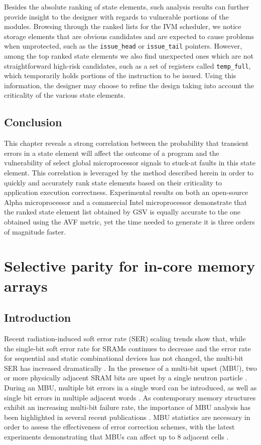 \documentclass[12pt]{yalephd}
\begin{document}
Besides the absolute ranking of state elements, such analysis results can further provide insight to the designer with regards to vulnerable portions of the modules. Browsing through the ranked lists for the IVM scheduler,  we notice storage elements that are obvious candidates and are expected to cause problems when unprotected, such as the {\tt issue\_head} or {\tt issue\_tail} pointers. However, among the top ranked state elements we also find unexpected ones which are not straightforward high-risk candidates, such as a set of registers called {\tt temp\_full}, which temporarily holds portions of the instruction to be issued. Using this information, the designer may choose to refine the design taking into account the criticality of the various state elements.

\section{Conclusion}

This chapter reveals a strong correlation between the probability that transient errors in a state element will affect the outcome of a program and the vulnerability of select global microprocessor signals to stuck-at faults in this state element. This correlation is leveraged by the method described herein in order to quickly and accurately rank state elements based on their criticality to application execution correctness. Experimental results on both an open-source Alpha microprocessor and a commercial Intel microprocessor demonstrate that the ranked state element list obtained by GSV is equally accurate to the one obtained using the AVF metric, yet the time needed to generate it is three orders of magnitude faster.

\chapter{Selective parity for in-core memory arrays}

\section{Introduction}

Recent radiation-induced soft error rate (SER) scaling trends show that, while the single-bit soft error rate for SRAMs continues to decrease and the error rate for sequential and static combinational devices has not changed, the multi-bit SER has increased dramatically \cite{seifert2006radiation}. In the presence of a multi-bit upset (MBU), two or more physically adjacent SRAM bits are upset by a single neutron particle \cite{reed1997heavy}. During an MBU, multiple bit errors in a single word can be introduced, as well as single bit errors in multiple adjacent words \cite{koga1993single}. As contemporary memory structures exhibit an increasing multi-bit failure rate, the importance of MBU analysis has been highlighted in several recent publications \cite{tipton2006multiple, tosaka2004comprehensive}. MBU statistics are necessary in order to assess the effectiveness of error correction schemes, with the latest experiments demonstrating that MBUs can affect up to 8 adjacent cells \cite{georgakos2007investigation}.
\end{document}

